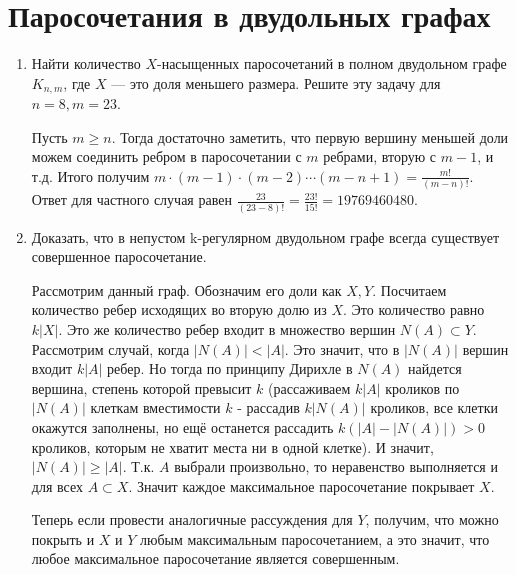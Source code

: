 \documentclass[fleqn]{article}
\begin{document}
	\section{Паросочетания в двудольных графах}
	\begin{enumerate}
		\item Найти количество $X$-насыщенных паросочетаний в полном двудольном графе $K_{n,m}$, где $X$ — это доля меньшего размера. Решите эту задачу для $n=8,m=23$.
		
		
		Пусть $m \geqslant n$. Тогда достаточно заметить, что первую вершину меньшей доли можем соединить ребром в паросочетании с $m$ ребрами, вторую с $m-1$, и т.д. Итого получим $m\cdot(m-1)\cdot (m-2)\cdots (m-n+1) = \frac{m!}{(m-n)!}$. Ответ для частного случая равен $\frac{23}{(23-8)!} = \frac{23!}{15!} = 19769460480$.
		
		\item Доказать, что в непустом k-регулярном двудольном графе всегда существует совершенное паросочетание.
		
		Рассмотрим данный граф. Обозначим его доли как $X, Y$. Посчитаем количество ребер исходящих во вторую долю из $X$. Это количество равно $k|X|$. Это же количество ребер входит в множество вершин $N(A) \subset Y$. Рассмотрим случай, когда $|N(A)| < |A|$. Это значит, что в $|N(A)|$ вершин входит $k|A|$ ребер. Но тогда по принципу Дирихле в $N(A)$ найдется вершина, степень которой превысит $k$ (рассаживаем $k|A|$ кроликов по $|N(A)|$ клеткам вместимости $k$ - рассадив $k|N(A)|$ кроликов, все клетки окажутся заполнены, но ещё останется рассадить $k(|A| - |N(A)|) > 0$ кроликов, которым не хватит места ни в одной клетке). И значит, $|N(A)|\geqslant |A|$. Т.к. $A$ выбрали произвольно, то неравенство выполняется и для всех $A \subset X$. Значит каждое максимальное паросочетание покрывает $X$. 
		
		Теперь если провести аналогичные рассуждения для $Y$, получим, что можно покрыть и $X$ и $Y$ любым максимальным паросочетанием, а это значит, что любое максимальное паросочетание является совершенным.
	\end{enumerate}
\end{document}
